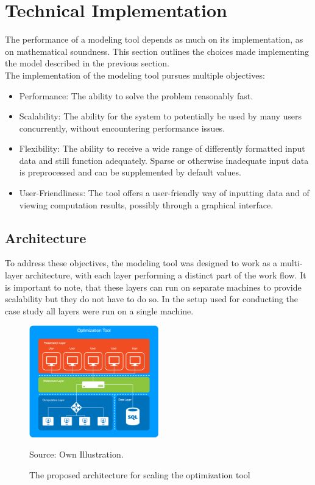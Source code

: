 \documentclass[
	11pt,								%
	DIV10,								%
	a4paper,         					%
	oneside,							%
	headheight=20pt,					%
	footheight=20pt,					%
    parskip=full,						%
    listof=totoc,						%
	bibliography=totoc,					%
	index=totoc,						%
]{scrartcl}
\begin{document}
\section{Technical Implementation}
The performance of a modeling tool depends as much on its implementation, as on mathematical soundness. This section outlines the choices made implementing the model described in the previous section.\\
The implementation of the modeling tool pursues multiple objectives:
\begin{itemize}
	\item Performance: The ability to solve the problem reasonably fast.
	\item Scalability: The ability for the system to potentially be used by many users concurrently, without encountering performance issues.
	\item Flexibility: The ability to receive a wide range of differently formatted input data and still function adequately. Sparse or otherwise inadequate input data is preprocessed and can be supplemented by default values.
	\item User-Friendliness: The tool offers a user-friendly way of inputting data and of viewing computation results, possibly through a graphical interface.
\end{itemize}
\subsection{Architecture}
To address these objectives, the modeling tool was designed to work as a multi-layer architecture, with each layer performing a distinct part of the work flow. It is important to note, that these layers can run on separate machines to provide scalability but they do not have to do so. In the setup used for conducting the case study all layers were run on a single machine. 
\begin{figure}[H]
	\centering
	\includegraphics[width=0.5\textwidth]{pictures/ARCHITECTURE.png}
	\caption{The proposed architecture for scaling the optimization tool}
	\label{architecture}
	\flushleft\quad\quad\footnotesize{Source: Own Illustration.}
\end{figure}	
\end{document}
